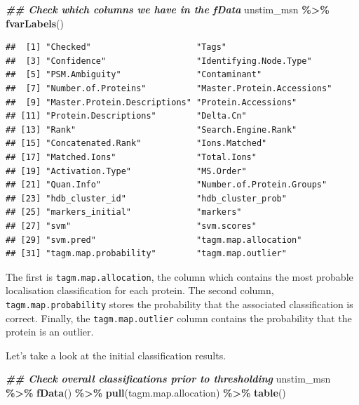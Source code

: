 \documentclass[9pt,a4paper,]{extarticle}
\newenvironment{Shaded}{\begin{snugshade}}{\end{snugshade}}
\newcommand{\DocumentationTok}[1]{\textcolor[rgb]{0.56,0.35,0.01}{\textbf{\textit{#1}}}}
\newcommand{\FunctionTok}[1]{\textcolor[rgb]{0.13,0.29,0.53}{\textbf{#1}}}
\newcommand{\NormalTok}[1]{#1}
\newcommand{\SpecialCharTok}[1]{\textcolor[rgb]{0.81,0.36,0.00}{\textbf{#1}}}
\begin{document}
\begin{Shaded}
\begin{Highlighting}[]
\DocumentationTok{\#\# Check which columns we have in the fData}
\NormalTok{unstim\_msn }\SpecialCharTok{\%\textgreater{}\%} 
  \FunctionTok{fvarLabels}\NormalTok{()}
\end{Highlighting}
\end{Shaded}

\begin{verbatim}
##  [1] "Checked"                     "Tags"                       
##  [3] "Confidence"                  "Identifying.Node.Type"      
##  [5] "PSM.Ambiguity"               "Contaminant"                
##  [7] "Number.of.Proteins"          "Master.Protein.Accessions"  
##  [9] "Master.Protein.Descriptions" "Protein.Accessions"         
## [11] "Protein.Descriptions"        "Delta.Cn"                   
## [13] "Rank"                        "Search.Engine.Rank"         
## [15] "Concatenated.Rank"           "Ions.Matched"               
## [17] "Matched.Ions"                "Total.Ions"                 
## [19] "Activation.Type"             "MS.Order"                   
## [21] "Quan.Info"                   "Number.of.Protein.Groups"   
## [23] "hdb_cluster_id"              "hdb_cluster_prob"           
## [25] "markers_initial"             "markers"                    
## [27] "svm"                         "svm.scores"                 
## [29] "svm.pred"                    "tagm.map.allocation"        
## [31] "tagm.map.probability"        "tagm.map.outlier"
\end{verbatim}

The first is \texttt{tagm.map.allocation}, the column which contains the most probable
localisation classification for each protein. The second column,
\texttt{tagm.map.probability} stores the probability that the associated classification
is correct. Finally, the \texttt{tagm.map.outlier} column contains the probability that
the protein is an outlier.

Let's take a look at the initial classification results.

\begin{Shaded}
\begin{Highlighting}[]
\DocumentationTok{\#\# Check overall classifications prior to thresholding}
\NormalTok{unstim\_msn }\SpecialCharTok{\%\textgreater{}\%}
  \FunctionTok{fData}\NormalTok{() }\SpecialCharTok{\%\textgreater{}\%}
  \FunctionTok{pull}\NormalTok{(tagm.map.allocation) }\SpecialCharTok{\%\textgreater{}\%}
  \FunctionTok{table}\NormalTok{()}
\end{Highlighting}
\end{Shaded}
\end{document}
